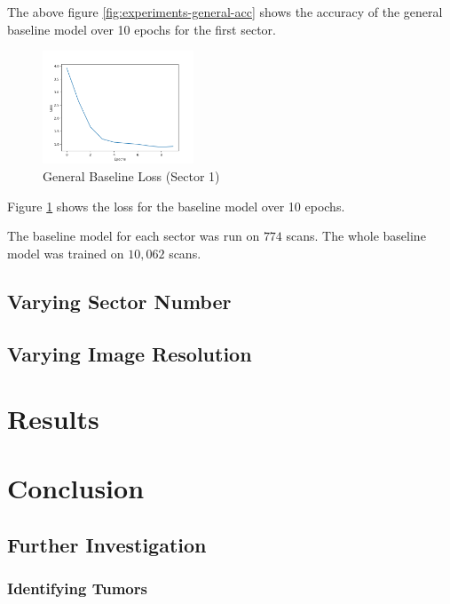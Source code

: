 \documentclass[10pt,twocolumn,letterpaper]{article}
\begin{document}
      The above figure \ref{fig:experiments-general-acc} shows the accuracy of the general baseline model over 10 epochs for the first sector.
      
      \begin{figure}
         \centering
         \includegraphics[width=0.4\textwidth]{./images/training_loss_13_sector_128_px.png}
         \caption{General Baseline Loss (Sector 1)}
         \label{fig:experiments-general-loss}
      \end{figure}
    
      Figure \ref{fig:experiments-general-loss} shows the loss for the baseline model over 10 epochs.
    
      The baseline model for each sector was run on $774$ scans. The whole baseline model was trained on $10,062$ scans.
   \subsection{Varying Sector Number} \label{sec:experiments-sector}


   \subsection{Varying Image Resolution} \label{sec:experiements-res}

\section{Results} \label{sec:results}

\section{Conclusion} \label{sec:conclusion}

   \subsection{Further Investigation} \label{sec:further}

      \subsubsection{Identifying Tumors} \label{sec:id-tumor}
\end{document}
